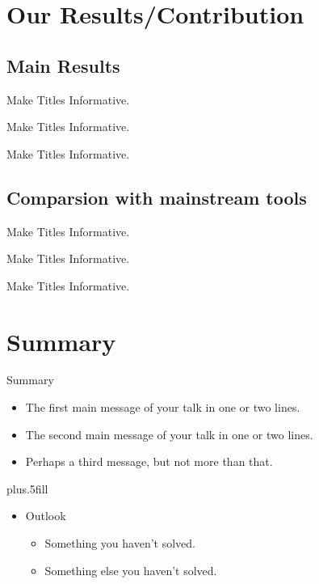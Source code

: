 \documentclass{beamer}
\begin{document}
\section{Our Results/Contribution}
\subsection{Main Results}

\begin{frame}{Make Titles Informative.}
\end{frame}

\begin{frame}{Make Titles Informative.}
\end{frame}

\begin{frame}{Make Titles Informative.}
\end{frame}


\subsection{Comparsion with mainstream tools}

\begin{frame}{Make Titles Informative.}
\end{frame}

\begin{frame}{Make Titles Informative.}
\end{frame}

\begin{frame}{Make Titles Informative.}
\end{frame}


\section*{Summary}

\begin{frame}{Summary}

  \begin{itemize}
  \item
    The \alert{first main message} of your talk in one or two lines.
  \item
    The \alert{second main message} of your talk in one or two lines.
  \item
    Perhaps a \alert{third message}, but not more than that.
  \end{itemize}
  
  \vskip0pt plus.5fill
  \begin{itemize}
  \item
    Outlook
    \begin{itemize}
    \item
      Something you haven't solved.
    \item
      Something else you haven't solved.
    \end{itemize}
  \end{itemize}
\end{frame}
\end{document}
